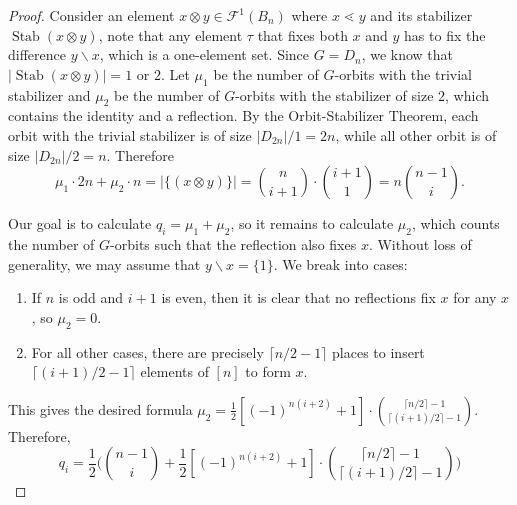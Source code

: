 \documentclass{amsart}
\theoremstyle{remark}
\newcommand{\minus}{\backslash}
\newcommand{\dstyle}{\displaystyle}
\def\Stab{\operatorname{Stab}}
\begin{document}
\begin{proof}
Consider an element $x \otimes y \in \mathcal F^1(B_n)$ where $x \lessdot y$ and its stabilizer $\Stab{(x \otimes y)}$, note that any element $\tau $ that fixes both $x$ and $y$ has to fix the difference $y\minus x$, which is a one-element set. Since $G = D_n$, %
we know that $|\Stab (x \otimes y)| = 1 $ or $2$.  %
Let $\mu_1$ be the number of $G$-orbits with the trivial stabilizer and $\mu_2$ be the number of $G$-orbits with the stabilizer of size $2$, which contains the identity and a reflection. By the Orbit-Stabilizer Theorem, each orbit with the trivial stabilizer is of size $|D_{2n}| /1 = 2n $, while all other orbit is of size $|D_{2n}|/2 = n$.  Therefore $$\mu_1 \cdot 2n + \mu_2 \cdot n = |\{(x \otimes y)\}| = {n \choose {i+1}}  \cdot {{i+1} \choose 1} = n {n-1 \choose i }.$$

Our goal is to calculate $q_i = \mu_1 + \mu_2$,
so it remains to calculate $\mu_2$, which counts the number of $G$-orbits such that the reflection also fixes $x$. Without loss of generality, we may assume that $y\minus x = \{1\}$. %
We break into cases:
\begin{enumerate}
\item If $n$ is odd and $i+1$ is even, then it is clear that no reflections fix $x$ for any $x$, so $\mu_2=0$. 
\item For all other cases, there are precisely $\lceil n/2 -1\rceil$ places to insert $\lceil (i+1)/2 - 1 \rceil$ elements of $[n]$ to form $x$. %
\end{enumerate}
This gives the desired formula $\dstyle \mu_2 =  \frac{1}{2} [(-1)^{n(i+2)}+1] \cdot { \lceil n/2\rceil -1  \choose \lceil (i+1)/2 \rceil - 1}   $. Therefore, 
$$q_i = \frac{1}{2} \Big( {n-1 \choose i } + \frac{1}{2} [(-1)^{n(i+2)}+1] \cdot { \lceil n/2\rceil -1  \choose \lceil (i+1)/2 \rceil - 1}    \Big)$$
\end{proof}
\end{document}
